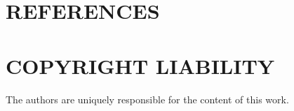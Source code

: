 \documentclass[10pt,fleqn,a4paper,twoside]{article}
\begin{document}
   \section{REFERENCES}
    
    
        
        
        

\section{COPYRIGHT LIABILITY}
    
        The authors are uniquely responsible for the content of this work.
\end{document}
